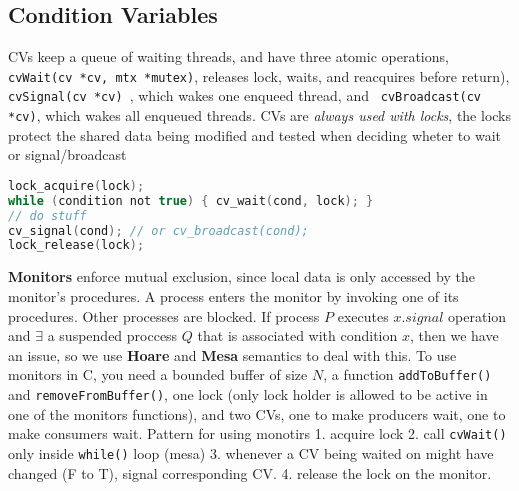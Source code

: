 \subsection*{Condition Variables}
CVs keep a queue of waiting threads, and have three atomic operations,
{\tt cvWait(cv *cv, mtx *mutex)}, releases lock, waits, and reacquires before
return), {\tt cvSignal(cv *cv) }, which wakes one enqueed thread, and {\tt
cvBroadcast(cv *cv)}, which wakes all enqueued threads. CVs are \textit{always used with locks}, the locks protect the shared data being modified and tested when deciding wheter to wait or signal/broadcast
\begin{lstlisting}[basicstyle=\tiny, language=c]
lock_acquire(lock);
while (condition not true) { cv_wait(cond, lock); }
// do stuff
cv_signal(cond); // or cv_broadcast(cond);
lock_release(lock);
\end{lstlisting}
\textbf{Monitors} enforce mutual exclusion, since local data is only accessed by the monitor's procedures. A process enters the monitor by invoking one of its procedures. Other processes are blocked.
If process $P$ executes $x.signal$ operation and $\exists$ a suspended proccess
$Q$ that is associated with condition $x$, then we have an issue, so we use
\textbf{Hoare} and \textbf{Mesa} semantics to deal with this. To use monitors in 
C, you need a bounded buffer of size $N$, a function {\tt addToBuffer()} and
{\tt removeFromBuffer()}, one lock (only lock holder is allowed to be active in
one of the monitors functions), and two CVs, one to make producers wait, one to
make consumers wait.
Pattern for using monotirs
    1. acquire lock
    2. call {\tt cvWait()} only inside {\tt while()} loop (mesa)
    3. whenever a CV being waited on might have changed (F to T), signal
    corresponding CV.
    4. release the lock on the monitor.
